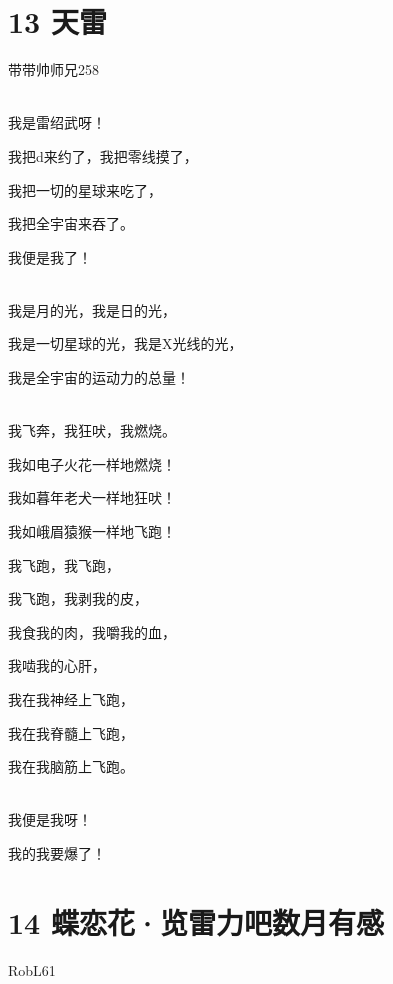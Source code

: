 \documentclass[UTF8,12pt,oneside]{ctexbook}
\begin{document}
    \section{13 天雷}
    \begin{center}
        \Large
        \songti
        \large
        
        带带帅师兄258
        
        ~\\
        我是雷绍武呀！
        
        我把d来约了，我把零线摸了，
        
        我把一切的星球来吃了，
        
        我把全宇宙来吞了。
        
        我便是我了！
        
        ~\\
        
        我是月的光，我是日的光，
        
        我是一切星球的光，我是X光线的光，
        
        我是全宇宙的运动力的总量！
        
        ~\\
        
        我飞奔，我狂吠，我燃烧。
        
        我如电子火花一样地燃烧！
        
        我如暮年老犬一样地狂吠！
        
        我如峨眉猿猴一样地飞跑！
        
        我飞跑，我飞跑，
        
        我飞跑，我剥我的皮，
        
        我食我的肉，我嚼我的血，
        
        我啮我的心肝，
        
        我在我神经上飞跑，
        
        我在我脊髓上飞跑，
        
        我在我脑筋上飞跑。
        
        ~\\
        
        我便是我呀！
        
        我的我要爆了！

    \end{center}

    \newpage
    
    \section{14 蝶恋花·览雷力吧数月有感}
    \begin{center}
        RobL61
        
    \end{center}
       
\end{document}
